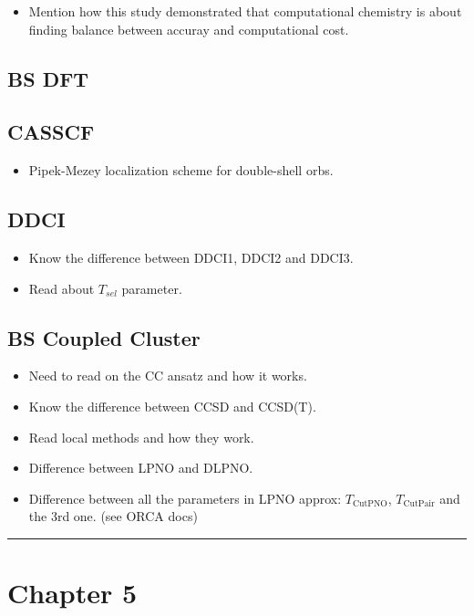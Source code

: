 \documentclass{article}
\newcommand*\sepline
{
  \begin{center}
    \rule[1ex]{.7\textwidth}{.5pt}
  \end{center}
}
\begin{document}
\begin{itemize}
    \item Mention how this study demonstrated that computational chemistry is about finding balance between accuray and computational cost.
\end{itemize}

\subsection{BS DFT}

\subsection{CASSCF}

\begin{itemize}
    \item Pipek-Mezey localization scheme for double-shell orbs.
\end{itemize}

\subsection{DDCI}

\begin{itemize}
    \item Know the difference between DDCI1, DDCI2 and DDCI3.
    \item Read about $T_{sel}$ parameter.
\end{itemize}

\subsection{BS Coupled Cluster}

\begin{itemize}
    \item Need to read on the CC ansatz and how it works.
    \item Know the difference between CCSD and CCSD(T).
    \item Read local methods and how they work.
    \item Difference between LPNO and DLPNO.
    \item Difference between all the parameters in LPNO approx: $T_{\text{CutPNO}}$, $T_{\text{CutPair}}$ and the 3rd one. (see ORCA docs)
\end{itemize}

\sepline

\section{Chapter 5}
\end{document}
